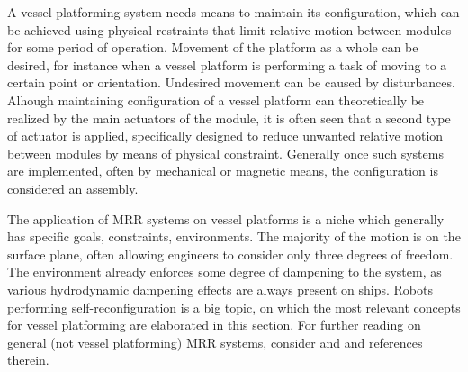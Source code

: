 A vessel platforming system needs means to maintain its configuration, which can be achieved using physical restraints that limit relative motion between modules for some period of operation. Movement of the platform as a whole can be desired, for instance when a vessel platform is performing a task of moving to a certain point or orientation. Undesired movement can be caused by disturbances. Alhough maintaining configuration of a vessel platform can theoretically be realized by the main actuators of the module, it is often seen that a second type of actuator is applied, specifically designed to reduce unwanted relative motion between modules by means of physical constraint. Generally once such systems are implemented, often by  mechanical \cite{mateos2019autonomous} \cite{o2014self} or magnetic \cite{kelly2019algorithms} means, the configuration is considered an assembly.


The application of MRR systems on vessel platforms is a niche which generally has specific goals, constraints, environments. The majority of the motion is on the surface plane, often allowing engineers to consider only three degrees of freedom. The environment already enforces some degree of dampening to the system, as various hydrodynamic dampening effects are always present on ships. Robots performing self-reconfiguration is a big topic, on which the most relevant concepts for vessel platforming are elaborated in this section. For further reading on general (not vessel platforming) MRR systems, consider \citet{yim2007modular} and \citet{seo2019modular} and references therein.








